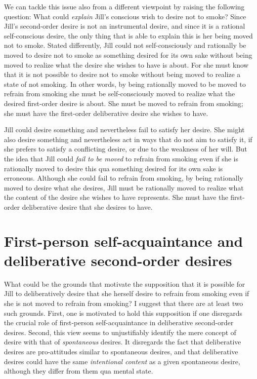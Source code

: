 \documentclass[output=paper]{langscibook}
\begin{document}
We can tackle this issue also from a different viewpoint by raising the following question: What could \textit{explain} Jill’s conscious wish to desire not to smoke? Since Jill’s second-order desire is not an instrumental desire, and since it is a rational self-conscious desire, the only thing that is able to explain this is her being moved not to smoke. Stated differently, Jill could not self-consciously and rationally be moved to desire not to smoke as something desired for its own sake without being moved to realize what the desire she wishes to have is about. For she must know that it is not possible to desire not to smoke without being moved to realize a state of not smoking. In other words, by being rationally moved to be moved to refrain from smoking she must be self-consciously moved to realize what the desired first-order desire is about. She must be moved to refrain from smoking; she must have the first-order deliberative desire she wishes to have.

Jill could desire something and nevertheless fail to satisfy her desire. She might also desire something and nevertheless act in ways that do not aim to satisfy it, if she prefers to satisfy a conflicting desire, or due to the weakness of her will. But the idea that Jill could \textit{fail to be moved} to refrain from smoking even if she is rationally moved to desire this qua something desired for its own sake is erroneous. Although she could fail to refrain from smoking, by being rationally moved to desire what she desires, Jill must be rationally moved to realize what the content of the desire she wishes to have represents. She must have the first-order deliberative desire that she desires to have.

\section{First-person self-acquaintance and deliberative second-order desires}

What could be the grounds that motivate the supposition that it is possible for Jill to deliberatively desire that she herself desire to refrain from smoking even if she is not moved to refrain from smoking? I suggest that there are at least two such grounds. First, one is motivated to hold this supposition if one disregards the crucial role of first-person self-acquaintance in deliberative second-order desires. Second, this view seems to unjustifiably identify the mere concept of desire with that of \textit{spontaneous} desires. It disregards the fact that deliberative desires are pro-attitudes similar to spontaneous desires, and that deliberative desires could have the same \textit{intentional content} as a given spontaneous desire, although they differ from them qua mental state. 
\end{document}
